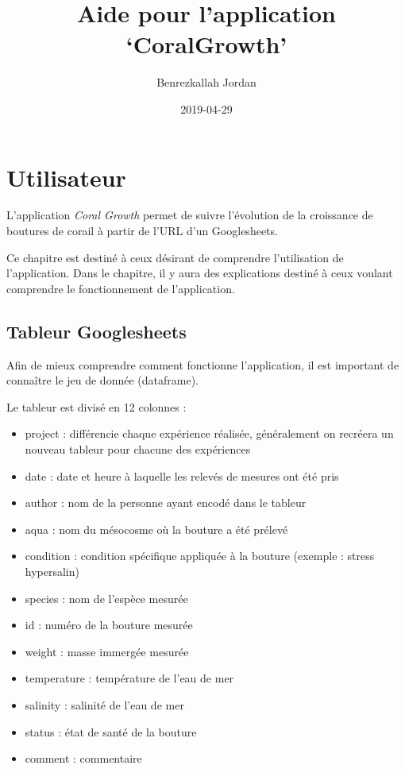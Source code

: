 \documentclass[]{book}
\title{Aide pour l'application `CoralGrowth'}
\author{Benrezkallah Jordan}
\date{2019-04-29}
\providecommand{\tightlist}{%
  \setlength{\itemsep}{0pt}\setlength{\parskip}{0pt}}
\begin{document}
\maketitle

{
\setcounter{tocdepth}{1}
\tableofcontents
}
\chapter{Utilisateur}\label{utilisateur}

L'application \emph{Coral Growth} permet de suivre l'évolution de la
croissance de boutures de corail à partir de l'URL d'un Googlesheets.

Ce chapitre est destiné à ceux désirant de comprendre l'utilisation de
l'application. Dans le chapitre, il y aura des explications destiné à
ceux voulant comprendre le fonctionnement de l'application.

\section{Tableur Googlesheets}\label{tableur-googlesheets}

Afin de mieux comprendre comment fonctionne l'application, il est
important de connaître le jeu de donnée (dataframe).

Le tableur est divisé en 12 colonnes :

\begin{itemize}
\tightlist
\item
  project : différencie chaque expérience réalisée, généralement on
  recréera un nouveau tableur pour chacune des expériences
\item
  date : date et heure à laquelle les relevés de mesures ont été pris
\item
  author : nom de la personne ayant encodé dans le tableur
\item
  aqua : nom du mésocosme où la bouture a été prélevé
\item
  condition : condition spécifique appliquée à la bouture (exemple :
  stress hypersalin)
\item
  species : nom de l'espèce mesurée
\item
  id : numéro de la bouture mesurée
\item
  weight : masse immergée mesurée
\item
  temperature : température de l'eau de mer
\item
  salinity : salinité de l'eau de mer
\item
  status : état de santé de la bouture
\item
  comment : commentaire
\end{itemize}
\end{document}
